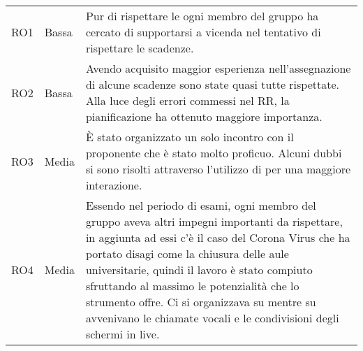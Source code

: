 {\begin{longtable}{C{2cm} C{3cm} C{10cm}}
RO1 &
Bassa &
Pur di rispettare le  ogni membro del gruppo ha cercato di supportarsi a vicenda nel tentativo di rispettare le scadenze. \\

RO2 &
Bassa &
Avendo acquisito maggior esperienza nell'assegnazione di alcune scadenze sono state quasi tutte rispettate. Alla luce degli errori commessi nel RR, la pianificazione ha ottenuto maggiore importanza. \\

RO3 &
Media &
È stato organizzato un solo incontro con il proponente che è stato molto proficuo. Alcuni dubbi si sono risolti attraverso l'utilizzo di  per una maggiore interazione. \\

RO4 &
Media &
Essendo nel periodo di esami, ogni membro del gruppo aveva altri impegni importanti da rispettare, in aggiunta ad essi c'è il caso del Corona Virus che ha portato disagi come la chiusura delle aule universitarie, quindi il lavoro è stato compiuto sfruttando al massimo le potenzialità che lo strumento  offre. Ci si organizzava su  mentre su  avvenivano le chiamate vocali e le condivisioni degli schermi in live.  \\

\end{longtable}	
}